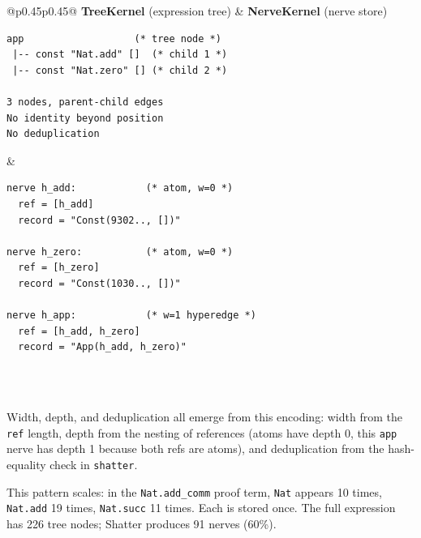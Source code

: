 \begin{center}\small
\begin{tabular}{@{}p{}p{}@{}}
\toprule
\textbf{TreeKernel} (expression tree) & \textbf{NerveKernel} (nerve store) \\
\midrule
\begin{lstlisting}[language={},basicstyle=\tiny\ttfamily,frame=none,backgroundcolor=\color{green!3}]
app                   (* tree node *)
 |-- const "Nat.add" []  (* child 1 *)
 |-- const "Nat.zero" [] (* child 2 *)

3 nodes, parent-child edges
No identity beyond position
No deduplication
\end{lstlisting}
&
\begin{lstlisting}[language={},basicstyle=\tiny\ttfamily,frame=none,backgroundcolor=\color{blue!3}]
nerve h_add:            (* atom, w=0 *)
  ref = [h_add]
  record = "Const(9302.., [])"

nerve h_zero:           (* atom, w=0 *)
  ref = [h_zero]
  record = "Const(1030.., [])"

nerve h_app:            (* w=1 hyperedge *)
  ref = [h_add, h_zero]
  record = "App(h_add, h_zero)"
\end{lstlisting}
\\
\midrule
{} \\
\bottomrule
\end{tabular}
\end{center}

Width, depth, and deduplication all emerge from this encoding: width from the \texttt{ref} length, depth from the nesting of references (atoms have depth 0, this \texttt{app} nerve has depth 1 because both refs are atoms), and deduplication from the hash-equality check in \texttt{shatter}.

This pattern scales: in the \texttt{Nat.add\_comm} proof term, \texttt{Nat} appears 10 times, \texttt{Nat.add} 19 times, \texttt{Nat.succ} 11 times.  Each is stored once.  The full expression has 226 tree nodes; Shatter produces 91 nerves (60\%).

